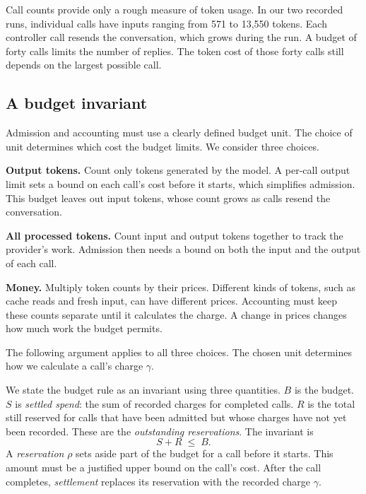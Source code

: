 Call counts provide only a rough measure of token usage. In our two recorded runs, individual
calls have inputs ranging from 571 to 13{,}550 tokens. Each controller call resends the
conversation, which grows during the run. A budget of forty calls limits the number of replies.
The token cost of those forty calls still depends on the largest possible call.

\subsection{A budget invariant}
\label{sec:budgets-invariant}

Admission and accounting must use a clearly defined budget unit. The choice of unit determines
which cost the budget limits. We consider three choices.

\bi

\item \textbf{Output tokens.} Count only tokens generated by the model. A per-call output limit
sets a bound on each call's cost before it starts, which simplifies admission. This budget leaves
out input tokens, whose count grows as calls resend the conversation.

\item \textbf{All processed tokens.} Count input and output tokens together to track the provider's
work. Admission then needs a bound on both the input and the output of each call.

\item \textbf{Money.} Multiply token counts by their prices. Different kinds of tokens, such as
cache reads and fresh input, can have different prices. Accounting must keep these counts separate
until it calculates the charge. A change in prices changes how much work the budget permits.

\ei

\noindent The following argument applies to all three choices. The chosen unit determines how we
calculate a call's charge $\gamma$.

We state the budget rule as an invariant using three quantities. $B$ is the budget. $S$ is
\emph{settled spend}: the sum of recorded charges for completed calls. $R$ is the total still
reserved for calls that have been admitted but whose charges have not yet been recorded. These
are the \emph{outstanding reservations}. The invariant is
\[
  S + R \;\leq\; B .
\]
A \emph{reservation} $\rho$ sets aside part of the budget for a call before it starts. This
amount must be a justified upper bound on the call's cost. After the call completes,
\emph{settlement} replaces its reservation with the recorded charge $\gamma$.

